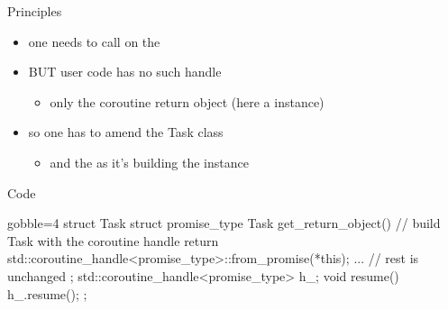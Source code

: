 \begin{frame}[fragile]
  \begin{block}{Principles}
    \begin{itemize}
    \item one needs to call  on the 
    \item BUT user code has no such handle
      \begin{itemize}
      \item only the coroutine return object (here a  instance)
      \end{itemize}
    \item so one has to amend the Task class
      \begin{itemize}
      \item and the  as it's building the  instance
      \end{itemize}
    \end{itemize}
  \end{block}
  \begin{exampleblock}{Code}
    {\scriptsize
      \begin{cppcode*}{gobble=4}
        struct Task {
          struct promise_type {
            Task get_return_object() {
              // build Task with the coroutine handle
              return {std::coroutine_handle<promise_type>::from_promise(*this)};
            }
            ... // rest is unchanged
          };
          std::coroutine_handle<promise_type> h_;
          void resume() { h_.resume(); }
        };
      \end{cppcode*}
    }
  \end{exampleblock}
\end{frame}

